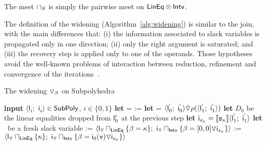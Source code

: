 \documentclass{llncs}
\begin{document}
 The meet $\sqcap_S$ is simply the pairwise meet on $\mathsf{LinEq} \otimes \mathsf{Intv}$.

The definition of the widening (Algorithm~\ref{alg:widening})  is similar to the join, with the main differences that: 
(i) the information associated to  slack variables is propagated only in one direction; 
(ii) only the right argument is saturated; and
(iii) the recovery step is applied only to one of the operands.
Those hypotheses avoid the well-known problems of interaction between reduction, refinement and convergence of the iterations~\cite{Mine01-2}.


\begin{algorithm}[t]
\caption{The widening $\triangledown_{S}$ on Subpolyhedra}
\label{alg:widening}
\begin{algorithmic}
\STATE \textbf{input} $\langle \mathsf{\mathsf{l}}_{i}^{};\ \mathsf{\mathsf{i}}_{i}^{} \rangle \in \mathsf{SubPoly}$, $i \in \{0, 1\}$
\medskip
\STATE \textbf{let}  = 
\STATE
\smallskip
{}
\STATE  {} :=   
\ENDFOR
\STATE
\smallskip
{}
\STATE  \textbf{let}  \subpolyPair{\widening}{} = $ \langle \mathsf{\mathsf{l}}_{0}^{'};\ \mathsf{\mathsf{i}}_{0}^{'} \rangle \dot{\triangledown}  \rho(\langle \mathsf{\mathsf{l}}_{1}^{'};\ \mathsf{\mathsf{i}}_{1}^{'} \rangle)$
\STATE
\smallskip
{}
\STATE \textbf{let} $D_{0}$ be the linear equalities dropped from $\mathsf{\mathsf{l}}'_0$ at the previous step
\STATE \textbf{let} $\mathsf{\mathsf{i}}_{s_\kappa} = \llbracket \mathtt{s_\kappa} \rrbracket\langle \mathsf{\mathsf{l}}_{1}^{'};\ \mathsf{\mathsf{i}}_{1}^{'} \rangle$
\STATE \textbf{let} \slackvar\ be a fresh slack variable
\STATE \subpolyPair{\widening}{} := $\langle \mathsf{\mathsf{l}}_{\triangledown} \sqcap_{\mathsf{LinEq}} \{ \beta_{} = \kappa\};\ \mathsf{\mathsf{i}}_{\triangledown} \sqcap_{\mathsf{Intv}} \{ \beta_{} =  [0,0] \triangledown \mathsf{\mathsf{i}}_{s_\kappa} \} \rangle$ 
\ENDIF
{}
\STATE  \subpolyPair{\widening}{} := $\tupla{\lineq_\widening \meet_\Lineq \{ \kappa\};\ \intv_\widening \sqcap_\Intervals \{ \slackvar =  \intv_0(\code{v}) \widening \intv_{s_\kappa} \}}$  
\ENDIF
\ENDIF
\ENDFOR
\smallskip
\RETURN \subpolyPair{\widening}{}
\end{algorithmic}
\end{algorithm} 
\end{document}
